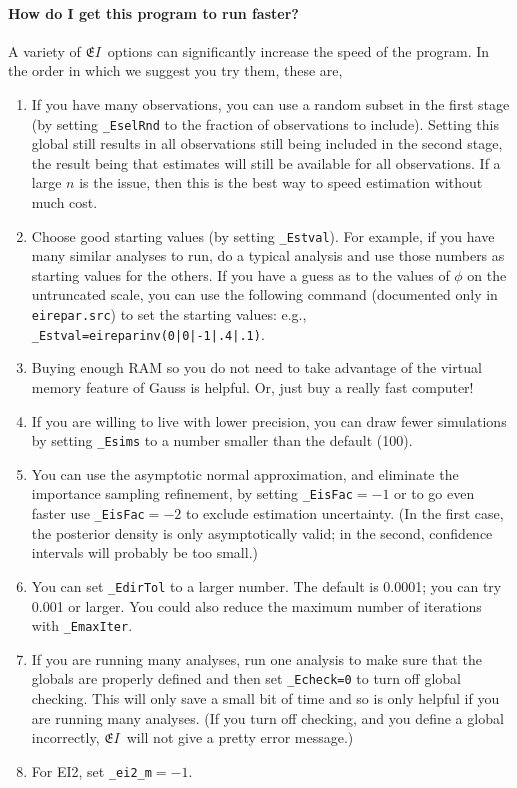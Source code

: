 \documentclass[11pt,titlepage]{article}
\newcommand{\EI}{\ensuremath{{\mathfrak EI}}}
\begin{document}
\paragraph{How do I get this program to run faster?}  A
variety of \EI\ options can significantly increase the speed of the
program.  In the order in which we suggest you try them, these are,
\begin{enumerate}
\item If you have many observations, you can use a random subset in
  the first stage (by setting \texttt{\_EselRnd} to the fraction of
  observations to include).  Setting this global still results in all
  observations still being included in the second stage, the result
  being that estimates will still be available for all observations.
  If a large $n$ is the issue, then this is the best way to speed
  estimation without much cost.

\item Choose good starting values (by setting \texttt{\_Estval}).  For
  example, if you have many similar analyses to run, do a typical
  analysis and use those numbers as starting values for the others.
  If you have a guess as to the values of $\phi$ on the untruncated
  scale, you can use the following command (documented only in
  \texttt{eirepar.src}) to set the starting values: e.g.,
  \texttt{\_Estval=eireparinv(0|0|-1|.4|.1)}.

\item Buying enough RAM so you do not need to take advantage of the
  virtual memory feature of Gauss is helpful.  Or, just buy a really
  fast computer!

\item If you are willing to live with lower precision, you can draw
  fewer simulations by setting \texttt{\_Esims} to a number smaller
  than the default (100).
  
\item You can use the asymptotic normal approximation, and eliminate
  the importance sampling refinement, by setting
  \texttt{\_EisFac}$=-1$ or to go even faster use
  \texttt{\_EisFac}$=-2$ to exclude estimation uncertainty.  (In the
  first case, the posterior density is only asymptotically valid; in
  the second, confidence intervals will probably be too small.)

\item You can set \texttt{\_EdirTol} to a larger number.  The default
  is 0.0001; you can try 0.001 or larger.  You could also reduce the
  maximum number of iterations with \texttt{\_EmaxIter}.

\item If you are running many analyses, run one analysis to make sure
  that the globals are properly defined and then set
  \texttt{\_Echeck=0} to turn off global checking.  This will only
  save a small bit of time and so is only helpful if you are running
  many analyses.  (If you turn off checking, and you define a global
  incorrectly, \EI\ will not give a pretty error message.)

\item For EI2, set \texttt{\_ei2\_m}$=-1$.
\end{enumerate}
\end{document}
